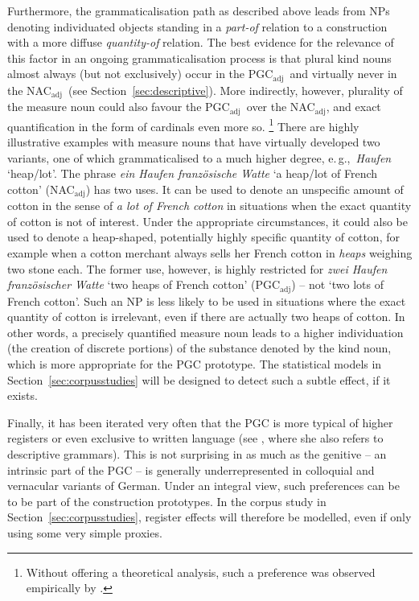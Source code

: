 \documentclass[USenglish]{article}
\newcommand{\eg}{e.\,g.,}
\newcommand{\Sub}[1]{\ensuremath{\mathrm{_{#1}}}}
\newcommand{\NACa}{NAC\Sub{adj}}
\newcommand{\PGCa}{PGC\Sub{adj}}
\begin{document}
Furthermore, the grammaticalisation path as described above leads from NPs denoting individuated objects standing in a \textit{part-of} relation to a construction with a more diffuse \textit{quantity-of} relation.
The best evidence for the relevance of this factor in an ongoing grammaticalisation process is that plural kind nouns almost always (but not exclusively) occur in the \PGCa\ and virtually never in the \NACa\ (see Section~\ref{sec:descriptive}).
More indirectly, however, plurality of the measure noun could also favour the \PGCa\ over the \NACa, and exact quantification in the form of cardinals even more so.%
\footnote{Without offering a theoretical analysis, such a preference was observed empirically by \cite{Hentschel1993}.}
There are highly illustrative examples with measure nouns that have virtually developed two variants, one of which grammaticalised to a much higher degree, \eg\ \textit{Haufen} `heap\slash lot'.
The phrase \textit{ein Haufen französische Watte} `a heap\slash lot of French cotton' (\NACa) has two uses.
It can be used to denote an unspecific amount of cotton in the sense of \textit{a lot of French cotton} in situations when the exact quantity of cotton is not of interest.
Under the appropriate circumstances, it could also be used to denote a heap-shaped, potentially highly specific quantity of cotton, for example when a cotton merchant always sells her French cotton in \textit{heaps} weighing two stone each.
The former use, however, is highly restricted for \textit{zwei Haufen französischer Watte} `two heaps of French cotton' (\PGCa) -- not `two lots of French cotton'.
Such an NP is less likely to be used in situations where the exact quantity of cotton is irrelevant, even if there are actually two heaps of cotton.
In other words, a precisely quantified measure noun leads to a higher individuation (the creation of discrete portions) of the substance denoted by the kind noun, which is more appropriate for the PGC prototype.
The statistical models in Section~\ref{sec:corpusstudies} will be designed to detect such a subtle effect, if it exists.

Finally, it has been iterated very often that the PGC is more typical of higher registers or even exclusive to written language (see \citealp[320--323]{Hentschel1993}, where she also refers to descriptive grammars).
This is not surprising in as much as the genitive -- an intrinsic part of the PGC -- is generally underrepresented in colloquial and vernacular variants of German.
Under an integral view, such preferences can be to be part of the construction prototypes.
In the corpus study in Section~\ref{sec:corpusstudies}, register effects will therefore be modelled, even if only using some very simple proxies.
\end{document}
